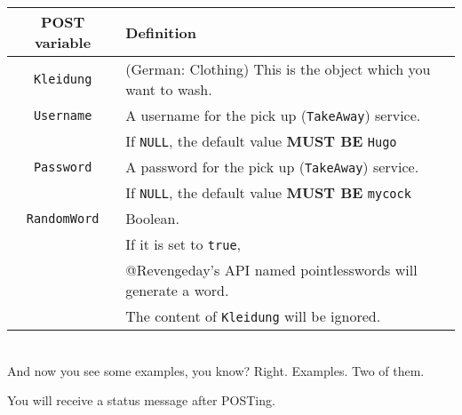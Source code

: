 \documentclass[letterpaper,twoside]{scrartcl}
\begin{document}
   \begin{tabular}[ht]{|c|l|}
    \hline
    POST variable & Definition \\
    \hline\hline
    \texttt{Kleidung} & (German: Clothing) This is the object which you want to wash.\\
    \hline
    \texttt{Username} & A username for the pick up (\texttt{TakeAway}) service. \\ 
	  & If \texttt{NULL}, the default value \textbf{MUST BE} \texttt{Hugo}\\
    \hline
    \texttt{Password} & A password for the pick up (\texttt{TakeAway}) service. \\ 
 	  & If \texttt{NULL}, the default value \textbf{MUST BE} \texttt{mycock}\\
    \hline
    \texttt{RandomWord} & Boolean. \\
            & If it is set to \texttt{true}, \\
	    & @Revengeday's API named pointlesswords will generate a word.\\
	    & The content of \texttt{Kleidung} will be ignored.\\
    \hline
   \end{tabular}
   \\
   \newline
   And now you see some examples, you know?\newline
   Right.\newline 
   Examples.\newline
   Two of them.\newline


   \vspace{8mm}

   \newline\newline
   You will receive a status message after POSTing.\newline\newline
\end{document}
